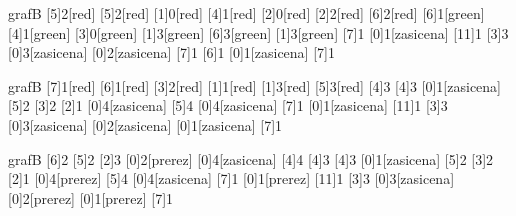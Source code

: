 \documentclass[14pt]{extarticle}
\begin{document}
\begin{pretok}{grafB}
    \nicle
    [5]{2}[red]
    [5]{2}[red]
    [1]{0}[red]
    [4]{1}[red]
    [2]{0}[red]
    [2]{2}[red]
    [6]{2}[red]
    [6]{1}[green]
    [4]{1}[green]
    [3]{0}[green]
    [1]{3}[green]
    [6]{3}[green]
    [1]{3}[green]
    [7]{1}
    [0]{1}[zasicena]
    [11]{1}
    [3]{3}
    [0]{3}[zasicena]
    [0]{2}[zasicena]
    [7]{1}
    [6]{1}
    [0]{1}[zasicena]
    [7]{1}

\end{pretok}

\begin{pretok}{grafB}
    \nicle
    [7]{1}[red]
    [6]{1}[red]
    [3]{2}[red]
    [1]{1}[red]
    [1]{3}[red]
    [5]{3}[red]
    [4]{3}
    [4]{3}
    [0]{1}[zasicena]
    [5]{2}
    [3]{2}
    [2]{1}
    [0]{4}[zasicena]
    [5]{4}
    [0]{4}[zasicena]
    [7]{1}
    [0]{1}[zasicena]
    [11]{1}
    [3]{3}
    [0]{3}[zasicena]
    [0]{2}[zasicena]
    [0]{1}[zasicena]
    [7]{1}

\end{pretok}

\begin{pretok}{grafB}
    \nicle
    [6]{2}
    [5]{2}
    [2]{3}
    [0]{2}[prerez]
    [0]{4}[zasicena]
    [4]{4}
    [4]{3}
    [4]{3}
    [0]{1}[zasicena]
    [5]{2}
    [3]{2}
    [2]{1}
    [0]{4}[prerez]
    [5]{4}
    [0]{4}[zasicena]
    [7]{1}
    [0]{1}[prerez]
    [11]{1}
    [3]{3}
    [0]{3}[zasicena]
    [0]{2}[prerez]
    [0]{1}[prerez]
    [7]{1}


\end{pretok}
\end{document}
